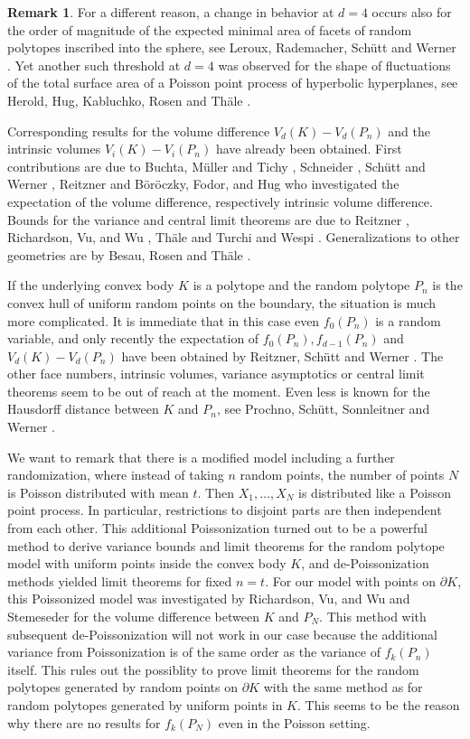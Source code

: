 \documentclass[12pt]{article}
\def\bd{{\partial}}
\theoremstyle{definition}
\newtheorem{remark}[theorem]{Remark}
\begin{document}
\begin{remark}
For a different reason, a change in behavior at $d=4$ occurs also for the order of magnitude of the expected minimal area of facets of random polytopes inscribed into the sphere, see Leroux, Rademacher, Schütt and Werner \cite{LRS+25}. Yet another such threshold at $d=4$ was observed for the shape of fluctuations of the total surface area of a Poisson point process of hyperbolic hyperplanes, see Herold, Hug, Kabluchko, Rosen and Thäle \cite{HHT21,KRT25}.
\end{remark}

Corresponding results for the volume difference $V_d(K)-V_d(P_n)$ and the intrinsic volumes $V_i(K)-V_i(P_n)$ have already been obtained. First contributions are due to Buchta, M\"uller and Tichy \cite{BMT85}, Schneider \cite{Schn88}, Sch\"utt and Werner \cite{SW5}, Reitzner \cite{Re02} and B\"or\"oczky, Fodor, and Hug \cite{BFH13} who investigated the expectation of the volume difference, respectively intrinsic volume difference.  Bounds for the variance and central limit theorems are due to Reitzner \cite{Re03}, Richardson, Vu, and Wu \cite{RVW08}, Th\"ale \cite{Thaele18} and Turchi and Wespi \cite{TuWe}. Generalizations to other geometries are by Besau, Rosen and Thäle \cite{BRT21}.

If the underlying convex body $K$ is a polytope and the random polytope $P_n$ is the convex hull of uniform random points on the boundary, the situation is much more complicated. It is immediate that in this case even $f_0(P_n)$ is a random variable, and only recently the expectation of $f_0(P_n), f_{d-1}(P_n)$ and $V_d(K)-V_d(P_n)$ have been obtained by Reitzner, Sch\"utt and Werner \cite{RSW23}. The other face numbers, intrinsic volumes, variance asymptotics or central limit theorems seem to be out of reach at the moment. Even less is known for the Hausdorff distance between $K$ and $P_n$, see Prochno, Sch\"utt, Sonnleitner and Werner \cite{PSS+25}.


\medskip
We want to remark that there is a modified model including a further randomization, where instead of taking $n$ random points, the number of points $N$ is Poisson distributed with mean $t$. Then $X_1,\dots,X_N$ is distributed like a Poisson point process. In particular, restrictions to disjoint parts are then independent from each other. This additional Poissonization turned out to be a powerful method to derive variance bounds and limit theorems for the random polytope model with uniform points inside the convex body $K$, and de-Poissonization methods yielded limit theorems for fixed $n=t$. For our model with points on $\bd K$, this Poissonized model was investigated by Richardson, Vu, and Wu \cite{RVW08} and Stemeseder \cite{Stemeseder} for the volume difference between $K$ and $P_N$.  This method with subsequent de-Poissonization will not work in our case because the additional variance from Poissonization is of the same order as the variance of $f_k(P_n)$ itself. This rules out the possiblity to prove limit theorems for the random polytopes generated by random points on $\bd K$ with the same method as for random polytopes generated by uniform points in $K$. This seems to be the reason why there are no results for $f_k(P_N)$ even in the Poisson setting. 
\end{document}

